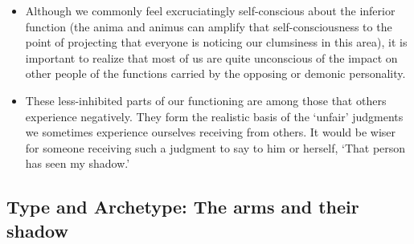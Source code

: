 \begin{itemize}
Beast is the demonic/daimonic personality, which in life, unlike the Beast at
the end of most versions of the fairy tale, does not transform into a handsome
prince. This most incorrigible of our function-attitudes stays a beast, but one
that to some extent can be tamed through the anima’s solicitous and energetic
care.

\item

Although we commonly feel excruciatingly self-conscious about the inferior
function (the anima and animus can amplify that self-consciousness to the point
of projecting that everyone is noticing our clumsiness in this area), it is
important to realize that most of us are quite unconscious of the impact on
other people of the functions carried by the opposing or demonic personality.

\item

These less-inhibited parts of our functioning are among those that others
experience negatively. They form the realistic basis of the ‘unfair’ judgments
we sometimes experience ourselves receiving from others. It would be wiser for
someone receiving such a judgment to say to him or herself, ‘That person has
seen my shadow.’

\end{itemize}

\subsection{Type and Archetype: The arms and their shadow}

